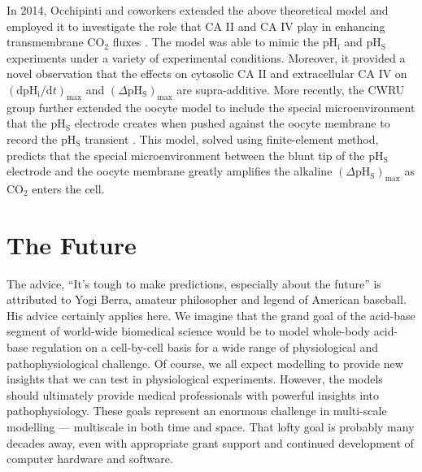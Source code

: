 \documentclass[fleqn,10pt]{physiome}
\begin{document}
In 2014, Occhipinti and coworkers extended the above theoretical model and employed it to investigate the role that CA II and CA IV play in enhancing transmembrane $\mathrm{CO_2}$ fluxes \citep{musa2014evidenceII,musa2014evidenceIV,occhipinti2014evidence}. The model was able to mimic the $\mathrm{pH_i}$ and $\mathrm{pH_S}$ experiments under a variety of experimental conditions. Moreover, it provided a novel observation that the effects on cytosolic CA II and extracellular CA IV on $(\mathrm{dpH_i}/\mathrm{d}t)_\mathrm{max}$ and $(\Delta\mathrm{pH_S})_\mathrm{max}$ are supra-additive. More recently, the CWRU group further extended the oocyte model to include the special microenvironment that the $\mathrm{pH_S}$ electrode creates when pushed against the oocyte membrane to record the $\mathrm{pH_S}$ transient \citep{calvetti2020}. This model, solved using finite-element method, predicts that the special microenvironment between the blunt tip of the $\mathrm{pH_S}$ electrode and the oocyte membrane greatly amplifies the alkaline $(\Delta\mathrm{pH_S})_\mathrm{max}$ as $\mathrm{CO_2}$ enters the cell.

\section{The Future}

The advice, ``It's tough to make predictions, especially about the future'' is attributed to Yogi Berra, amateur philosopher and legend of American baseball. His advice certainly applies here. We imagine that the grand goal of the acid-base segment of world-wide biomedical science would be to model whole-body acid-base regulation on a cell-by-cell basis for a wide range of physiological and pathophysiological challenge. Of course, we all expect modelling to provide new insights that we can test in physiological experiments. However, the models should ultimately provide medical professionals with powerful insights into pathophysiology. These goals represent an enormous challenge in multi-scale modelling --- multiscale in both time and space. That lofty goal is probably many decades away, even with appropriate grant support and continued development of computer hardware and software.
\end{document}
